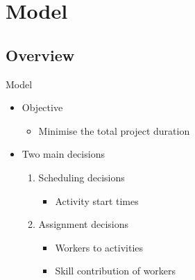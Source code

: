 \documentclass{beamer}
\begin{document}
\section{Model}
\subsection{Overview}
\begin{frame}{Model}
	\begin{itemize}
		\item \pause Objective
		\begin{itemize}
			\item Minimise the total project duration\pause
		\end{itemize}
	\end{itemize}
	\vspace{5mm}
	\begin{itemize}
		\item Two main decisions\pause
		\vspace{2mm}
		\begin{enumerate}
			\item Scheduling decisions
			\begin{itemize}
				\item Activity start times\pause
			\end{itemize}
			\vspace{2mm}
			\item Assignment decisions
			\begin{itemize}
				\item Workers to activities
				\vspace{1mm}
				\item Skill contribution of workers
			\end{itemize}
		\end{enumerate}
	\end{itemize}
\end{frame}
\end{document}
